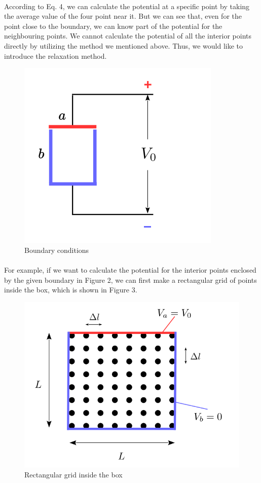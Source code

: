 \documentclass[12pt]{report}
\begin{document}
\paragraph{}According to Eq. 4, we can calculate the potential at a specific point by taking the average value of the four point near it. But we can see that, even for the point close to the boundary, we can know part of the potential for the neighbouring points. We cannot calculate the potential of all the interior points directly by utilizing the method we mentioned above. Thus, we would like to introduce the relaxation method.
\begin{figure}[H]
    \centering
    \includegraphics[width=0.35\linewidth]{3.png}
    \caption{Boundary conditions}
    \label{fig:my_label}
\end{figure}
\paragraph{}For example, if we want to calculate the potential for the interior points enclosed by the given boundary in Figure 2, we can first make a rectangular grid of points inside the box, which is shown in Figure 3.  
\begin{figure}[H]
    \centering
    \includegraphics[width=0.5\linewidth]{4.png}
    \caption{Rectangular grid inside the box}
    \label{fig:my_label}
\end{figure}
\end{document}
